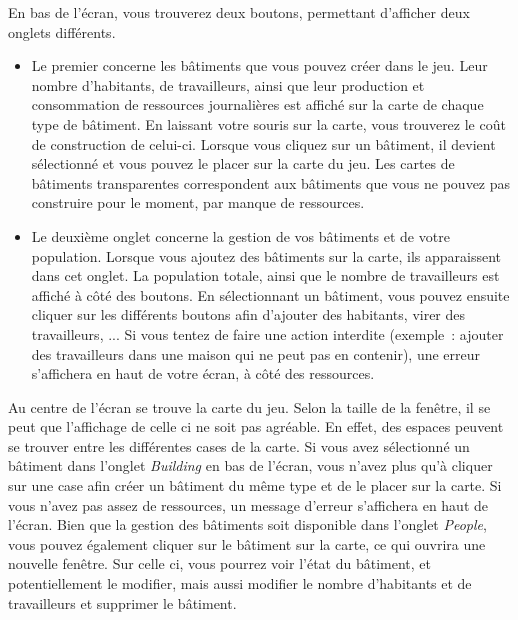 \documentclass{article}
\begin{document}
En bas de l'écran, vous trouverez deux boutons, permettant d'afficher deux onglets différents.
\begin{itemize}
\item Le premier concerne les bâtiments que vous pouvez créer dans le jeu. Leur nombre d'habitants, de travailleurs,
ainsi que leur production et consommation de ressources journalières est affiché sur la carte de chaque type de bâtiment.
En laissant votre souris sur la carte, vous trouverez le coût de construction de celui-ci.
Lorsque vous cliquez sur un bâtiment, il devient sélectionné et vous pouvez le placer sur la carte du jeu.
Les cartes de bâtiments transparentes correspondent aux bâtiments que vous ne pouvez pas construire pour le moment,
par manque de ressources.
\item Le deuxième onglet concerne la gestion de vos bâtiments et de votre population. Lorsque vous ajoutez
des bâtiments sur la carte, ils apparaissent dans cet onglet. La population totale, ainsi que
le nombre de travailleurs est affiché à côté des boutons. En sélectionnant un bâtiment, vous pouvez ensuite
cliquer sur les différents boutons afin d'ajouter des habitants, virer des travailleurs, ...
Si vous tentez de faire une action interdite (exemple : ajouter des travailleurs dans une maison qui ne peut pas en contenir),
une erreur s'affichera en haut de votre écran, à côté des ressources.
\end{itemize}

Au centre de l'écran se trouve la carte du jeu. Selon la taille de la fenêtre, il se peut
que l'affichage de celle ci ne soit pas agréable. En effet, des espaces peuvent se trouver
entre les différentes cases de la carte.
Si vous avez sélectionné un bâtiment dans l'onglet \textit{Building} en bas de l'écran, vous n'avez plus qu'à cliquer sur une case
afin créer un bâtiment du même type et de le placer sur la carte. Si vous n'avez pas assez de ressources,
un message d'erreur s'affichera en haut de l'écran. Bien que la gestion des bâtiments soit disponible
dans l'onglet \textit{People}, vous pouvez également cliquer sur le bâtiment sur la carte, ce qui ouvrira une 
nouvelle fenêtre. Sur celle ci, vous pourrez voir l'état du bâtiment, et potentiellement le modifier, mais aussi modifier le nombre
d'habitants et de travailleurs et supprimer le bâtiment.
\end{document}
